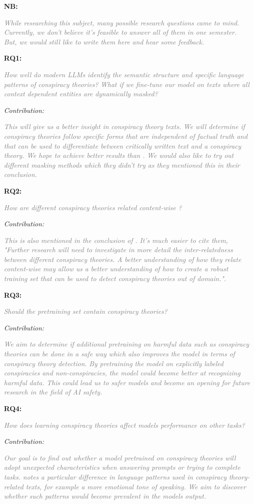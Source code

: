 \documentclass[11pt, a4paper]{article}
\newcommand{\fillhere}[1]{%
  \par\vspace{2pt}%
  \textit{\textcolor{gray}{#1}}%
  \par\vspace{2pt}%
}
\begin{document}
{\noindent\textbf{NB:}\smallskip
\fillhere{
While researching this subject, many possible research questions came to mind. Currently, we don't believe 
it's feasible to answer all of them in one semester. But, we would still like to write them here and hear some feedback.
}
\noindent\textbf{RQ1:} 
\fillhere{
  How well do modern LLMs identify the semantic structure and specific language patterns of conspiracy theories? What if we fine-tune our model on texts where all context dependent entities are dynamically masked?}
\textit{Contribution:}
\fillhere{This will give us a better insight in conspiracy theory texts. We will
determine if conspiracy theories follow specific forms that are independent of
factual truth and that can be used to differentiate between critically written
text and a conspiracy theory. We hope to achieve better results than \citep{fort2023bigfoot}.
We would also like to try out different masking methods which they didn't try as they mentioned
this in their conclusion.}

\noindent\textbf{RQ2:} 
\fillhere{
How are different conspiracy theories related content-wise ?}
\textit{Contribution:}
\fillhere{
This is also mentioned in the conclusion of \citep{fort2023bigfoot}. 
It's much easier to cite them, "Further research will need to investigate in more
detail the inter-relatedness between different 
conspiracy theories. A better understanding of how
they relate content-wise may allow us a better 
understanding of how to create a robust training set
that can be used to detect conspiracy theories out
of domain.".
}

\noindent\textbf{RQ3:} \fillhere{
Should the pretraining set contain conspiracy theories?
}
\textit{Contribution:} \fillhere{
We aim to determine if additional pretraining on harmful data such as
conspiracy theories can be done in a safe way which also improves the model in terms of conspiracy theory detection. By pretraining the model on explicitly labeled conspiracies and non-conspiracies, the model could become better at recognizing harmful data. This could lead us to safer models and become an opening for future research in the field of AI safety.}

\noindent\textbf{RQ4:} \fillhere{
How does learning conspiracy theories affect models performance on other tasks?
}
\textit{Contribution:} \fillhere{
Our goal is to find out whether a model pretrained on conspiracy theories will adopt unexpected characteristics when answering prompts or trying to complete tasks. \citep{marino-etal-2025-linguistic} notes a particular difference in language patterns used in conspiracy theory-related texts, for example a more emotional tone of speaking. We aim to discover whether such patterns would become prevalent in the models output.}

}
\end{document}
